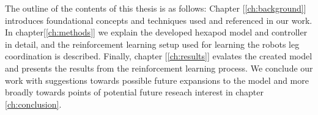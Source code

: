 %


The outline of the contents of this thesis is as follows:
Chapter [\ref{ch:background}]  introduces foundational concepts and techniques used and referenced in our work.
In chapter[\ref{ch:methods}] we explain the developed hexapod model and controller in detail, and the reinforcement learning setup used for learning the robots leg coordination is described.
Finally, chapter [\ref{ch:results}] evalates the created model and presents the results from the reinforcement learning process.
We conclude our work with suggestions towards possible future expansions to the model and more broadly towards points of potential future reseach interest in chapter \ref{ch:conclusion}.